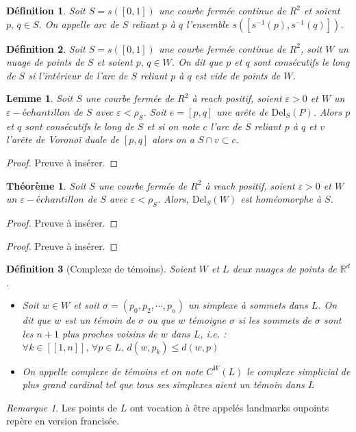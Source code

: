 \documentclass{report}
\newcommand{\R}{\mathbb{R}}
\newcommand{\Del}{\mathrm{Del}}
\newcommand{\eps}{\varepsilon}
\newtheorem{theorem}{Théorème}
\newtheorem{definition}{Définition}
\newtheorem{lemma}{Lemme}
\theoremstyle{remark}
\newtheorem*{rmq}{Remarque}
\begin{document}
\begin{definition}
	Soit $S = s([0,1])$ une courbe fermée continue de $R^2$ et soient $p, \, q\in S$. On appelle \textnormal{arc de $S$ reliant $p$ à $q$} l'ensemble $s\left(\left[s^{-1}(p), s^{-1}(q)\right]\right)$.
\end{definition}

\begin{definition}
	Soit $S = s([0,1])$ une courbe fermée continue de $R^2$, soit $W$ un nuage de points de $S$ et soient $p, \, q\in W$. On dit que $p$ et $q$ sont \textnormal{consécutifs le long de $S$} si l'intérieur de l'arc de $S$ reliant $p$ à $q$ est vide de points de $W$.
\end{definition}

\begin{lemma}
	Soit $S$ une courbe fermée de $R^2$ à reach positif, soient $\eps>0$ et $W$ un $\eps-échantillon$ de $S$ avec $\eps<\rho_S$. Soit $e = [p, q]$ une arête de $\Del_S(P)$. Alors $p$ et $q$ sont consécutifs le long de $S$ et si on note $c$ l'arc de $S$ reliant $p$ à $q$ et $v$ l'arête de Voronoï duale de $[p, q]$ alors on a $S\cap v\subset c$.
\end{lemma}

\begin{proof}
	Preuve à insérer.
\end{proof}

\begin{theorem}
	Soit $S$ une courbe fermée de $R^2$ à reach positif, soient $\eps>0$ et $W$ un $\eps-échantillon$ de $S$ avec $\eps<\rho_S$. Alors, $\Del_S(W)$ est homéomorphe à $S$.
\end{theorem}

\begin{proof}
	Preuve à insérer.
\end{proof}


\begin{proof}
	Preuve à insérer.
\end{proof}

\begin{definition}[Complexe de témoins]
	Soient $W$ et $L$ deux nuages de points de $\R^d$.
	\begin{itemize}
	\item[$\bullet$] Soit $w\in W$ et soit $\sigma = (p_0, p_2, \cdots, p_n)$ un simplexe à sommets dans $L$. On dit que $w$ est un \textnormal{témoin} de $\sigma$ ou que $w$ \textnormal{témoigne} $\sigma$ si les sommets de $\sigma$ sont les $n+1$ plus proches voisins de $w$ dans $L$, i.e. : $\forall k\in[\![1,n]\!],\, \forall p\in L,\, d(w, p_k)\leq d(w, p)$
	\item[$\bullet$] On appelle \textnormal{complexe de témoins} et on note $C^W(L)$ le complexe simplicial de plus grand cardinal tel que tous ses simplexes aient un témoin dans $L$
	\end{itemize}
\end{definition}

\begin{rmq}
	Les points de $L$ ont vocation à être appelés landmarks oupoints repère en version francisée.
\end{rmq}
\end{document}
